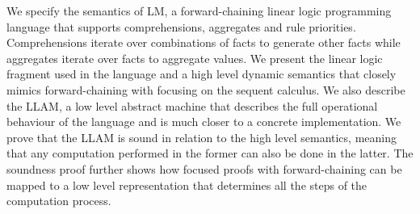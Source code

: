 We specify the semantics of LM, a forward-chaining linear logic programming
language that supports comprehensions, aggregates and rule priorities.
Comprehensions iterate over combinations of facts to generate other facts while
aggregates iterate over facts to aggregate values. We present the linear logic
fragment used in the language and a high level dynamic semantics that closely
mimics forward-chaining with focusing on the sequent calculus.  We also describe
the LLAM, a low level abstract machine that describes the full operational
behaviour of the language and is much closer to a concrete implementation. We
prove that the LLAM is sound in relation to the high level semantics, meaning
that any computation performed in the former can also be done in the latter. The
soundness proof further shows how focused proofs with forward-chaining can be
mapped to a low level representation that determines all the steps of the
computation process.
